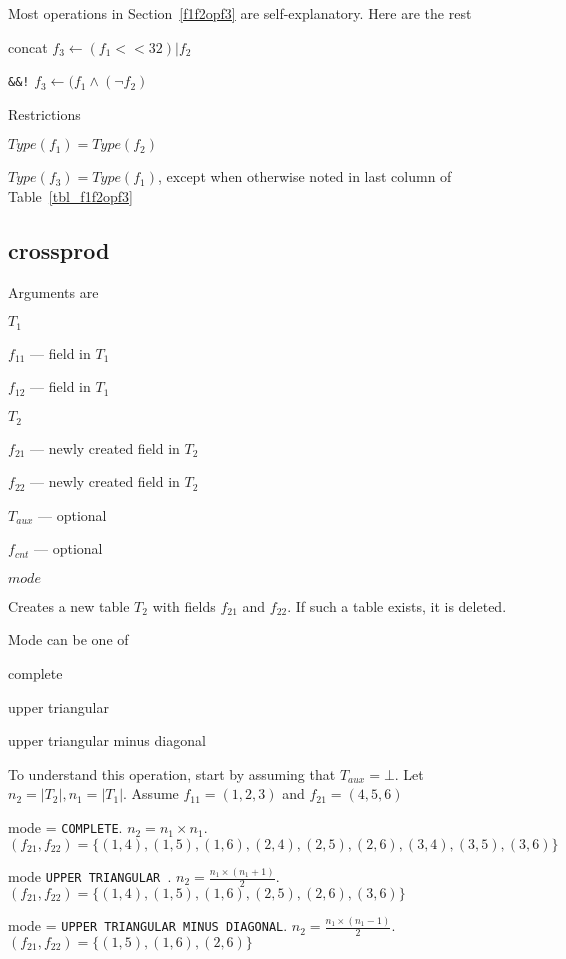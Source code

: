 Most operations in Section~\ref{f1f2opf3} are self-explanatory. Here are
the rest
\be
\item concat \(f_3 \leftarrow (f_1 << 32) | f_2 \)
\item \verb+&&!+ \(f_3 \leftarrow (f_1 \wedge (\neg f_2) \)
  \ee

Restrictions
\be
\item \(Type(f_1) = Type(f_2)\)
\item \(Type(f_3) = Type(f_1)\), except when otherwise noted in last
column of Table~\ref{tbl_f1f2opf3}
\ee

\subsection{crossprod}
\label{crossprod}

Arguments are 
\be
\item \(T_1\)
\item \(f_{11}\) --- field in \(T_1\) 
\item \(f_{12}\) --- field in \(T_1\) 
\item \(T_2\)
\item \(f_{21}\) --- newly created field in \(T_2\) 
\item \(f_{22}\) --- newly created field in \(T_2\) 
\item \(T_{aux}\) --- optional 
\item \(f_{cnt}\) --- optional 
\item \(mode\)
\ee

Creates a new table \(T_2\) with fields \(f_{21}\) and \(f_{22}\).  
If such a table exists, it is deleted. 

Mode can be one of
\be
\item complete
\item upper triangular 
\item upper triangular minus diagonal
\ee

To understand this operation, start by assuming that \(T_{aux} = \bot\).
Let \(n_2 = |T_2|, n_1 = |T_1|\). 
Assume \(f_{11} = (1, 2, 3)\)
and    \(f_{21} = (4, 5, 6)\)
\be
\item mode = {\tt COMPLETE}. 
\(n_2 = n_1 \times n_1\). 
\((f_{21}, f_{22}) = \{
(1,4), (1, 5), (1, 6), 
(2,4), (2, 5), (2, 6), 
(3,4), (3, 5), (3, 6)\}
\)
\item mode {\tt UPPER TRIANGULAR }. 
\(n_2 = \frac{n_1 \times (n_1+1)}{2}\).
\((f_{21}, f_{22}) = \{
(1,4), (1, 5), (1, 6), 
       (2, 5), (2, 6), 
               (3, 6)\}
\)
\item mode = {\tt UPPER TRIANGULAR MINUS DIAGONAL}. 
\(n_2 = \frac{n_1 \times (n_1-1)}{2}\).
\((f_{21}, f_{22}) = \{
       (1, 5), (1, 6), 
               (2, 6)
                     \}
\)
  \ee


